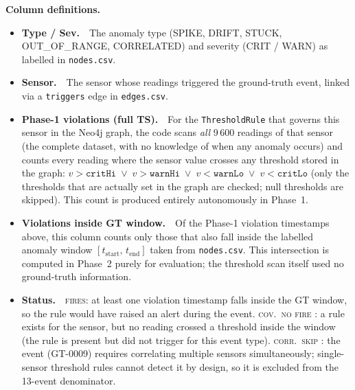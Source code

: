 ﻿\documentclass[11pt]{article}
\begin{document}
\begin{table}[H]
\begin{minipage}{\textwidth}
\medskip
\textbf{Column definitions.}
\begin{itemize}[leftmargin=1.2em,itemsep=1pt,topsep=2pt]

  \item \textbf{Type / Sev.}\ \ The anomaly type (SPIKE, DRIFT, STUCK,
    OUT\_OF\_RANGE, CORRELATED) and severity (CRIT / WARN) as labelled in
    \texttt{nodes.csv}.

  \item \textbf{Sensor.}\ \ The sensor whose readings triggered the
    ground-truth event, linked via a \texttt{triggers} edge in
    \texttt{edges.csv}.

  \item \textbf{Phase-1 violations (full TS).}\ \
    For the \texttt{ThresholdRule} that governs this sensor in the Neo4j
    graph, the code scans \emph{all} 9\,600 readings of that sensor
    (the complete dataset, with no knowledge of when any anomaly occurs)
    and counts every reading where the sensor value crosses any threshold
    stored in the graph:
    \(
      v > \mathtt{critHi}
      \;\lor\; v > \mathtt{warnHi}
      \;\lor\; v < \mathtt{warnLo}
      \;\lor\; v < \mathtt{critLo}
    \)
    (only the thresholds that are actually set in the graph are checked;
    null thresholds are skipped).
    This count is produced entirely autonomously in Phase~1.

  \item \textbf{Violations inside GT window.}\ \
    Of the Phase-1 violation timestamps above, this column counts only
    those that also fall inside the labelled anomaly window
    $[t_\text{start},\, t_\text{end}]$ taken from \texttt{nodes.csv}.
    This intersection is computed in Phase~2 purely for evaluation;
    the threshold scan itself used no ground-truth information.

  \item \textbf{Status.}\ \
    \textsc{fires}: at least one violation timestamp falls inside the GT
    window, so the rule would have raised an alert during the event.
    \textsc{cov.\ no fire} : a rule exists for the sensor, but no reading
    crossed a threshold inside the window (the rule is present but did not
    trigger for this event type).
    \textsc{corr.\ skip} : the event (GT-0009) requires correlating
    multiple sensors simultaneously; single-sensor threshold rules cannot
    detect it by design, so it is excluded from the 13-event denominator.

\end{itemize}


\end{minipage}
\end{table}
\end{document}
